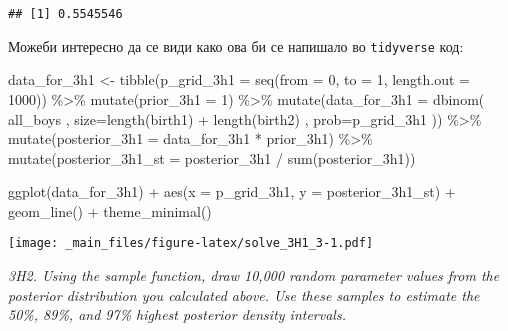 \documentclass[
]{book}
\newenvironment{Shaded}{\begin{snugshade}}{\end{snugshade}}
\newcommand{\AttributeTok}[1]{\textcolor[rgb]{0.77,0.63,0.00}{#1}}
\newcommand{\DecValTok}[1]{\textcolor[rgb]{0.00,0.00,0.81}{#1}}
\newcommand{\FunctionTok}[1]{\textcolor[rgb]{0.00,0.00,0.00}{#1}}
\newcommand{\NormalTok}[1]{#1}
\newcommand{\OtherTok}[1]{\textcolor[rgb]{0.56,0.35,0.01}{#1}}
\newcommand{\SpecialCharTok}[1]{\textcolor[rgb]{0.00,0.00,0.00}{#1}}
\begin{document}
\begin{verbatim}
## [1] 0.5545546
\end{verbatim}

Можеби интересно да се види како ова би се напишало во \texttt{tidyverse} код:

\begin{Shaded}
\begin{Highlighting}[]
\NormalTok{data\_for\_3h1 }\OtherTok{\textless{}{-}}
  \FunctionTok{tibble}\NormalTok{(}\AttributeTok{p\_grid\_3h1 =} \FunctionTok{seq}\NormalTok{(}\AttributeTok{from =} \DecValTok{0}\NormalTok{, }\AttributeTok{to =} \DecValTok{1}\NormalTok{, }\AttributeTok{length.out =} \DecValTok{1000}\NormalTok{)) }\SpecialCharTok{\%\textgreater{}\%} 
  \FunctionTok{mutate}\NormalTok{(}\AttributeTok{prior\_3h1 =} \DecValTok{1}\NormalTok{) }\SpecialCharTok{\%\textgreater{}\%} 
  \FunctionTok{mutate}\NormalTok{(}\AttributeTok{data\_for\_3h1 =} \FunctionTok{dbinom}\NormalTok{( all\_boys , }\AttributeTok{size=}\FunctionTok{length}\NormalTok{(birth1) }\SpecialCharTok{+} \FunctionTok{length}\NormalTok{(birth2) , }\AttributeTok{prob=}\NormalTok{p\_grid\_3h1 )) }\SpecialCharTok{\%\textgreater{}\%} 
  \FunctionTok{mutate}\NormalTok{(}\AttributeTok{posterior\_3h1 =}\NormalTok{ data\_for\_3h1 }\SpecialCharTok{*}\NormalTok{ prior\_3h1) }\SpecialCharTok{\%\textgreater{}\%} 
  \FunctionTok{mutate}\NormalTok{(}\AttributeTok{posterior\_3h1\_st =}\NormalTok{ posterior\_3h1 }\SpecialCharTok{/} \FunctionTok{sum}\NormalTok{(posterior\_3h1))}
\end{Highlighting}
\end{Shaded}

\begin{Shaded}
\begin{Highlighting}[]
\FunctionTok{ggplot}\NormalTok{(data\_for\_3h1) }\SpecialCharTok{+} 
  \FunctionTok{aes}\NormalTok{(}\AttributeTok{x =}\NormalTok{ p\_grid\_3h1, }\AttributeTok{y =}\NormalTok{ posterior\_3h1\_st) }\SpecialCharTok{+}
  \FunctionTok{geom\_line}\NormalTok{() }\SpecialCharTok{+}
  \FunctionTok{theme\_minimal}\NormalTok{()}
\end{Highlighting}
\end{Shaded}

\texttt{[image: \_main\_files/figure-latex/solve\_3H1\_3-1.pdf]}

\emph{3H2. Using the sample function, draw 10,000 random parameter values from the posterior distribution you calculated above. Use these samples to estimate the 50\%, 89\%, and 97\% highest posterior density intervals.}
\end{document}
